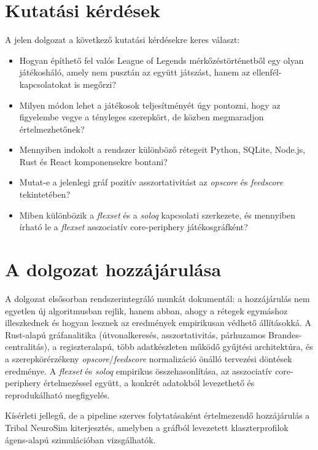 \section{Kutatási kérdések}

A jelen dolgozat a következő kutatási kérdésekre keres választ:

\begin{itemize}
    \item Hogyan építhető fel valós League of Legends mérkőzéstörténetből egy olyan játékosháló, amely nem pusztán az együtt játszást, hanem az ellenfél-kapcsolatokat is megőrzi?
    \item Milyen módon lehet a játékosok teljesítményét úgy pontozni, hogy az figyelembe vegye a tényleges szerepkört, de közben megmaradjon értelmezhetőnek?
    \item Mennyiben indokolt a rendszer különböző rétegeit Python, SQLite, Node.js, Rust és React komponensekre bontani?
    \item Mutat-e a jelenlegi gráf pozitív asszortativitást az \textit{opscore} és \textit{feedscore} tekintetében?
    \item Miben különbözik a \textit{flexset} és a \textit{soloq} kapcsolati szerkezete, és mennyiben írható le a \textit{flexset} asszociatív core-periphery játékosgráfként?
\end{itemize}

\section{A dolgozat hozzájárulása}

A dolgozat elsősorban rendszerintegráló munkát dokumentál: a hozzájárulás nem egyetlen új algoritmusban rejlik, hanem abban, ahogy a rétegek egymáshoz illeszkednek és hogyan lesznek az eredmények empirikusan védhető állításokká. A Rust-alapú gráfanalitika (útvonalkeresés, asszortativitás, párhuzamos Brandes-centralitás), a regiszteralapú, több adatkészleten működő gyűjtési architektúra, és a szerepkörérzékeny \textit{opscore}/\textit{feedscore} normalizáció önálló tervezési döntések eredménye. A \textit{flexset} és \textit{soloq} empirikus összehasonlítása, az asszociatív core-periphery értelmezéssel együtt, a konkrét adatokból levezethető és reprodukálható megfigyelés.

Kísérleti jellegű, de a pipeline szerves folytatásaként értelmezendő hozzájárulás a Tribal NeuroSim kiterjesztés, amelyben a gráfból levezetett klaszterprofilok ágens-alapú szimulációban vizsgálhatók.

